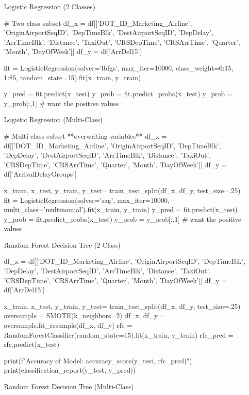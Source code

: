 \documentclass[a4paper,12pt]{article}
\begin{document}
Logistic Regression (2 Classes)

\begin{python}
# Two class subset
df_x = df[['DOT_ID_Marketing_Airline', 'OriginAirportSeqID', 'DepTimeBlk', 'DestAirportSeqID', 'DepDelay', 'ArrTimeBlk', 'Distance', 'TaxiOut', 'CRSDepTime',
 'CRSArrTime', 'Quarter', 'Month', 'DayOfWeek']]
df_y = df['ArrDel15']

fit = LogisticRegression(solver='lbfgs', max_iter=10000, class_weight={0:15, 1:85}, random_state=15).fit(x_train, y_train)

y_pred = fit.predict(x_test)
y_prob = fit.predict_proba(x_test)
y_prob = y_prob[:,1] # want the positive values
\end{python}

Logistic Regression (Multi-Class)

\begin{python}
# Multi class subset **overwriting variables**
df_x = df[['DOT_ID_Marketing_Airline', 'OriginAirportSeqID', 'DepTimeBlk', 'DepDelay', 'DestAirportSeqID', 'ArrTimeBlk', 'Distance', 'TaxiOut', 'CRSDepTime',
 'CRSArrTime', 'Quarter', 'Month', 'DayOfWeek']]
df_y = df['ArrivalDelayGroups']

x_train, x_test, y_train, y_test= train_test_split(df_x, df_y, test_size=.25)
fit = LogisticRegression(solver='sag', max_iter=10000, multi_class='multinomial').fit(x_train, y_train)
y_pred = fit.predict(x_test)
y_prob = fit.predict_proba(x_test)
y_prob = y_prob[:,1] # want the positive values
\end{python}

Random Forest Decision Tree (2 Class)

\begin{python}
df_x = df[['DOT_ID_Marketing_Airline', 'OriginAirportSeqID', 'DepTimeBlk', 'DepDelay', 'DestAirportSeqID', 'ArrTimeBlk', 'Distance', 'TaxiOut', 'CRSDepTime', 'CRSArrTime',
 'Quarter', 'Month', 'DayOfWeek']]
df_y = df['ArrDel15']

x_train, x_test, y_train, y_test= train_test_split(df_x, df_y, test_size=.25)
oversample = SMOTE(k_neighbors=2)
df_x, df_y = oversample.fit_resample(df_x, df_y)
rfc = RandomForestClassifier(random_state=15).fit(x_train, y_train)
rfc_pred = rfc.predict(x_test)

print(f"Accuracy of Model: {accuracy_score(y_test, rfc_pred)}")
print(classification_report(y_test, y_pred))

\end{python}

Random Forest Decision Tree (Multi-Class)
\end{document}
